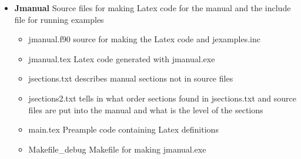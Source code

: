 \begin{itemize}
\begin{itemize}
\item \href{run:./jexamples.inc }{jexamples.inc} \hspace{0.2cm}include file which can be used to run all examples in the manual 
and which is generated with jmanual.exe 
\item \href{run:./cdat.txt}{cdat.txt} \hspace{0.2cm}example unit data file for small \textcolor{VioletRed}{jlp}() example in jexample.inc. 
\item xdat.txt\hspace{0.2cm}example schedule file for small \textcolor{VioletRed}{jlp}() example 
\item \href{run:./jlp92.pdf}{jlp92.pdf} \hspace{0.2cm}Manual of old JLP which explains the theory behind the jlp algorithm 
\item \href{run:./lappilempinen.pdf}{lappilempinen.pdf} \hspace{0.2cm} Paper explaining the theory behing factory optimization. 
\item \href{run:./hyvonenetal2019.pdf}{hyvonenetal2019.pdf} \hspace{0.2cm} A paper utilizing the factory optimization. 
\item \href{run:./JLp22development.docx} {Jlp22development.docx} \hspace{0.2cm} not up-to-date manual for developers 
\item \href{run:./fletcher.pdf}{fletcher.pdf} The theory behind the subroutines of Fletcher 
\end{itemize} 
 
\item \textbf{Jmanual} \hspace{0.2cm} Source files for making Latex code for 
the manual and the include file for running examples 
\begin{itemize} 
\item jmanual.f90 \hspace{0.2cm}source for making the Latex code and jexamples.inc 
\item jmanual.tex \hspace{0.2cm}Latex code generated with jmanual.exe 
\item jsections.txt \hspace{0.2cm}describes manual sections not in source files 
\item jsections2.txt \hspace{0.2cm}tells in what order sections found in jsections.txt 
and source files are put into the manual and what is the level of the sections 
\item main.tex  \hspace{0.2cm}Preample code containing Latex definitions 
\item Makefile\_debug \hspace{0.2cm}Makefile for making jmanual.exe 
\end{itemize} 
 

\end{itemize}
